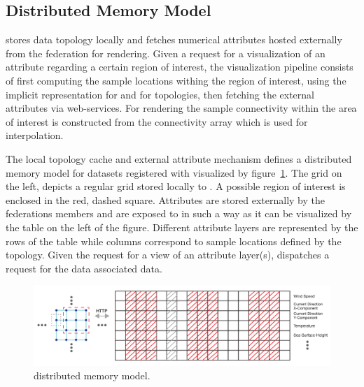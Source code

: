 \subsection{Distributed Memory Model}
\sciwms{} stores data topology locally and fetches numerical
attributes hosted externally from the federation for rendering. Given
a request for a visualization of an attribute regarding a certain
region of interest, the visualization pipeline consists of first
computing the sample locations withing the region of interest, using
the implicit representation for \cgrid{} and \rtree{} for \ugrid{}
topologies, then fetching the external attributes via \ogc{}
web-services. For rendering the sample connectivity within the area of
interest is constructed from the connectivity array which is used for
interpolation. 

The local topology cache and external attribute mechanism defines a
distributed memory model for datasets registered with \sciwms{}
visualized by figure~\ref{fig:sciwms_mem_model}. The grid on the left,
depicts a regular grid stored locally to \sciwms{}. A possible region
of interest is enclosed in the red, dashed square. Attributes are
stored externally by the federations members and are exposed to
\sciwms{} in such a way as it can be visualized by the table on the
left of the figure. Different attribute layers are represented by the
rows of the table while columns correspond to sample locations defined
by the topology. Given the request for a view of an attribute
layer(s), \sciwms{} dispatches a request for the data associated data.

\begin{figure}[ht!]
  \centering
  \includegraphics[width=\textwidth]{../figs/topology_memModel}
  \caption{\sciwms{} distributed memory model.}
  \label{fig:sciwms_mem_model}
\end{figure}
